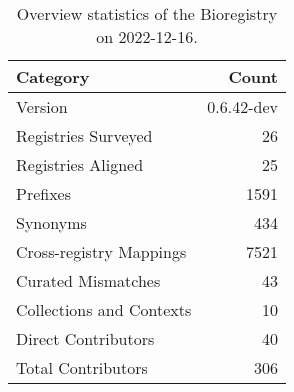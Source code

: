 \begin{table}
\centering
\caption{Overview statistics of the Bioregistry on 2022-12-16.}
\label{tab:bioregistry-summary}
\begin{tabular}{lr}
\toprule
                Category &      Count \\
\midrule
                 Version & 0.6.42-dev \\
     Registries Surveyed &         26 \\
      Registries Aligned &         25 \\
                Prefixes &       1591 \\
                Synonyms &        434 \\
 Cross-registry Mappings &       7521 \\
      Curated Mismatches &         43 \\
Collections and Contexts &         10 \\
     Direct Contributors &         40 \\
      Total Contributors &        306 \\
\bottomrule
\end{tabular}
\end{table}
